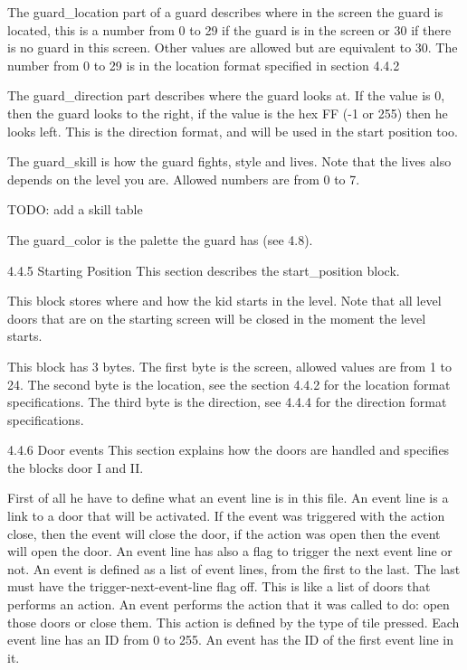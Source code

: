  The guard_location part of a guard describes where in the screen the guard
 is located, this is a number from 0 to 29 if the guard is in the screen or
 30 if there is no guard in this screen. Other values are allowed but are
 equivalent to 30. The number from 0 to 29 is in the location format
 specified in section 4.4.2
 
 The guard_direction part describes where the guard looks at. If the value
 is 0, then the guard looks to the right, if the value is the hex FF (-1 or
 255) then he looks left. This is the direction format, and will be used in
 the start position too.

 The guard_skill is how the guard fights, style and lives. Note that the
 lives also depends on the level you are. Allowed numbers are from 0 to 7.

 TODO: add a skill table

 The guard_color is the palette the guard has (see 4.8).

4.4.5 Starting Position
 This section describes the start_position block.
 
 This block stores where and how the kid starts in the level. Note that all
 level doors that are on the starting screen will be closed in the moment
 the level starts.
 
 This block has 3 bytes.
 The first byte is the screen, allowed values are from 1 to 24.
 The second byte is the location, see the section 4.4.2 for the location
 format specifications.
 The third byte is the direction, see 4.4.4 for the direction format
 specifications.

4.4.6 Door events
 This section explains how the doors are handled and specifies the blocks
 door I and II.

 First of all he have to define what an event line is in this file. An event
 line is a link to a door that will be activated. If the event was triggered
 with the action close, then the event will close the door, if the action
 was open then the event will open the door. An event line has also a flag
 to trigger the next event line or not.
 An event is defined as a list of event lines, from the first to the last.
 The last must have the trigger-next-event-line flag off. This is like a
 list of doors that performs an action.
 An event performs the action that it was called to do: open those doors or
 close them. This action is defined by the type of tile pressed.
 Each event line has an ID from 0 to 255. An event has the ID of the first
 event line in it.

